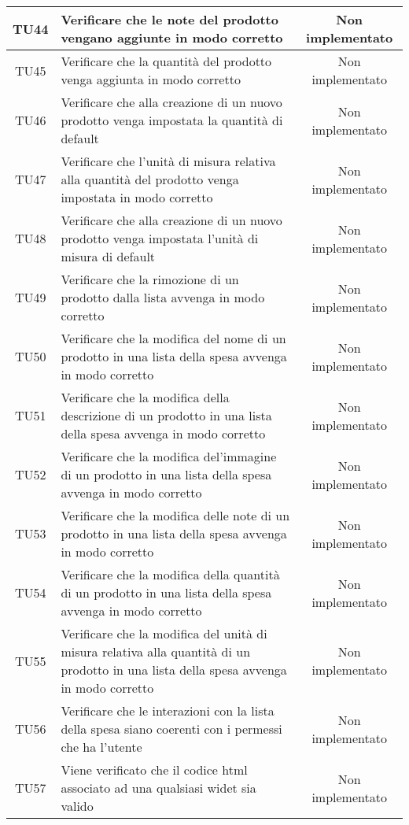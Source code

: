\begin{center}
\begin{longtable}{|c|>{\centering}m{10cm}|c|}
		TU44 & Verificare che le note del prodotto vengano aggiunte in modo corretto & Non implementato \\ \hline
		TU45 & Verificare che la quantità del prodotto venga aggiunta in modo corretto & Non implementato \\ \hline
		TU46 & Verificare che alla creazione di un nuovo prodotto venga impostata la quantità di default & Non implementato \\ \hline
		TU47 & Verificare che l'unità di misura relativa alla quantità del prodotto venga impostata in modo corretto & Non implementato \\ \hline
		TU48 & Verificare che alla creazione di un nuovo prodotto venga impostata l'unità di misura di default & Non implementato \\ \hline
		TU49 & Verificare che la rimozione di un prodotto dalla lista avvenga in modo corretto & Non implementato \\ \hline
		TU50 & Verificare che la modifica del nome di un prodotto in una lista della spesa avvenga in modo corretto & Non implementato \\ \hline
		TU51 & Verificare che la modifica della descrizione di un prodotto in una lista della spesa avvenga in modo corretto & Non implementato \\ \hline
		TU52 & Verificare che la modifica del'immagine di un prodotto in una lista della spesa avvenga in modo corretto & Non implementato \\ \hline
		TU53 & Verificare che la modifica delle note di un prodotto in una lista della spesa avvenga in modo corretto & Non implementato \\ \hline
		TU54 & Verificare che la modifica della quantità di un prodotto in una lista della spesa avvenga in modo corretto & Non implementato \\ \hline
		TU55 & Verificare che la modifica del unità di misura relativa alla quantità di un prodotto in una lista della spesa avvenga in modo corretto & Non implementato \\ \hline
		TU56 & Verificare che le interazioni con la lista della spesa siano coerenti con i permessi che ha l'utente & Non implementato \\ \hline
		TU57 & Viene verificato che il codice html associato ad una qualsiasi widet sia valido & Non implementato \\ \hline
	\end{longtable}
\end{center}
